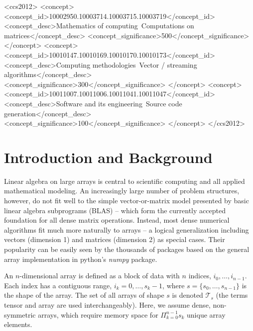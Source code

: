 \documentclass{sigplanconf}
\begin{document}
\begin{CCSXML}
<ccs2012>
 <concept>
  <concept_id>10002950.10003714.10003715.10003719</concept_id>
  <concept_desc>Mathematics of computing~Computations on matrices</concept_desc>
  <concept_significance>500</concept_significance>
 </concept>
 <concept>
  <concept_id>10010147.10010169.10010170.10010173</concept_id>
  <concept_desc>Computing methodologies~Vector / streaming algorithms</concept_desc>
  <concept_significance>300</concept_significance>
 </concept>
 <concept>
  <concept_id>10011007.10011006.10011041.10011047</concept_id>
  <concept_desc>Software and its engineering~Source code generation</concept_desc>
  <concept_significance>100</concept_significance>
 </concept>
</ccs2012>
\end{CCSXML}


\printccsdesc


\section{ Introduction and Background}

  Linear algebra on large arrays is central to scientific computing and all applied mathematical
modeling.  An increasingly large number of problem structures, however,
do not fit well to the simple vector-or-matrix model presented by basic linear
algebra subprograms (BLAS)\cite{blas} -- which form the currently accepted foundation for all
dense matrix operations.  Instead, most dense numerical algorithms fit much more naturally
to arrays -- a logical generalization including vectors (dimension 1) and matrices (dimension 2)
as special cases.  Their popularity can be easily seen by the thousands of packages based
on the general array implementation in python's {\em numpy} package.\cite{numpy}

  An $n$-dimensional array is defined as a block of data with $n$ indices, $i_0, \ldots, i_{n-1}$.
Each index has a contiguous range, $i_k = 0,\ldots,s_k-1$, where $s = \{s_0,\ldots,s_{n-1}\}$
is the shape of the array.  The set of all arrays of shape $s$ is denoted $\mathcal T_s$ (the terms
tensor and array are used interchangeably).
Here, we assume dense, non-symmetric arrays, which require memory space for
$\Pi_{k=0}^{n-1} s_k$ unique array elements.
\end{document}
